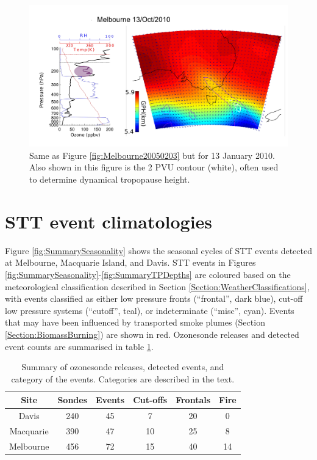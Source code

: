 \documentclass{article}
\begin{document}
    \begin{figure}[!htbp]
      \begin{center}
      \includegraphics[width=1.0\columnwidth]{figures/Melbourne20100113.png}
      \caption{Same as Figure \ref{fig:Melbourne20050203} but for 13 January 2010.
	Also shown in this figure is the 2 PVU contour (white), often used to determine dynamical tropopause height.}
      \label{fig:Melbourne20100113}
      \end{center}
    \end{figure}

\section{STT event climatologies}
  \label{sec:eventclimatologies}
  Figure \ref{fig:SummarySeasonality} shows the seasonal cycles of STT events detected at Melbourne, Macquarie Island, and Davis. 
  STT events in Figures \ref{fig:SummarySeasonality}-\ref{fig:SummaryTPDepths} are coloured based on the meteorological classification described in Section \ref{Section:WeatherClassifications}, with events classified as either low pressure fronts (“frontal”, dark blue), cut-off low pressure systems (“cutoff”, teal), or indeterminate (“misc”, cyan).
  Events that may have been influenced by transported smoke plumes (Section \ref{Section:BiomassBurning}) are shown in red.
  Ozonesonde releases and detected event counts are summarised in table \ref{table:EventCounts}.
  \begin{table}[htbp!]
    \centering
    \begin{tabular}{| c | c | c | c | c | c |} 
      \hline
      Site & Sondes & Events & Cut-offs & Frontals & Fire \\
      \hline
      Davis     & 240 & 45 & 7  & 20 & 0 \\ 
      Macquarie & 390 & 47 & 10 & 25 & 8 \\
      Melbourne & 456 & 72 & 15 & 40 & 14 \\
      \hline
    \end{tabular}
    \caption{Summary of ozonesonde releases, detected events, and category of the events.
      Categories are described in the text.}
    \label{table:EventCounts}
  \end{table}
  
\end{document}
